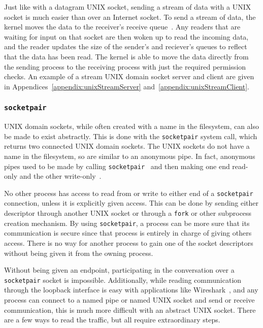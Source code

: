 Just like with a datagram UNIX socket, sending a stream of data with a UNIX socket is much easier than over an Internet socket.  To send a stream of data, the kernel moves the data to the receiver's receive queue~\cite[p 265--268]{Stevens:1996:TIT:233130}.  Any readers that are waiting for input on that socket are then woken up to read the incoming data, and the reader updates the size of the sender's and reciever's queues to reflect that the data has been read.  The kernel is able to move the data directly from the sending process to the receiving process with just the required permission checks.  An example of a stream UNIX domain socket server and client are given in Appendices~\ref{appendix:unixStreamServer} and~\ref{appendix:unixStreamClient}.

\subsubsection{\texttt{socketpair}}
\label{sec:socketpair}
UNIX domain sockets, while often created with a name in the filesystem, can also be made to exist abstractly.  This is done with the \texttt{socketpair} system call, which returns two connected UNIX domain sockets.  The UNIX sockets do not have a name in the filesystem, so are similar to an anonymous pipe.  In fact, anonymous pipes used to be made by calling \texttt{socketpair}~\cite{apple_2005} and then making one end read-only and the other write-only~\cite[p 253]{Stevens:1996:TIT:233130}.

No other process has access to read from or write to either end of a \texttt{socketpair} connection, unless it is explicitly given access.  This can be done by sending either descriptor through another UNIX socket or through a \texttt{fork} or other subprocess creation mechanism.  By using \texttt{socketpair}, a process can be more sure that its communication is secure since that process is entirely in charge of giving others access.  There is no way for another process to gain one of the socket descriptors without being given it from the owning process.

Without being given an endpoint, participating in the conversation over a \texttt{socketpair} socket is impossible.  Additionally, while reading communication through the loopback interface is easy with applications like Wireshark~\cite{wireshark}, and any process can connect to a named pipe or named UNIX socket and send or receive communication, this is much more difficult with an abstract UNIX socket.  There are a few ways to read the traffic, but all require extraordinary steps.

